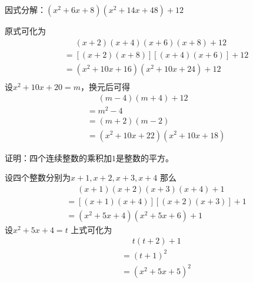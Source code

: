 \documentclass[windows,csize4]{BHCexam}
\begin{document}
\begin{groups}
\begin{questions}[]
        \question[5] 因式分解：$(x^2+6x+8)(x^2+14x+48)+12$
        \begin{solution}{0.5cm}
            \methodonly 原式可化为
            \[
                \begin{aligned}
                     & \phantom{=}(x+2)(x+4)(x+6)(x+8)+12 \\
                     & = [(x+2)(x+8)][(x+4)(x+6)]+12      \\
                     & = (x^2+10x+16)(x^2+10x+24) + 12    \\
                \end{aligned}
            \]
            设$x^2+10x+20=m$，换元后可得
            \[
                \begin{aligned}
                     & \phantom{=}(m-4)(m+4)+12   \\
                     & = m^2-4                    \\
                     & = (m+2)(m-2)               \\
                     & = (x^2+10x+22)(x^2+10x+18)
                \end{aligned}
            \]
        \end{solution}
        \vspace{3.5cm}


        \question[5] 证明：四个连续整数的乘积加$1$是整数的平方。
        \begin{solution}{0.5cm}
            \methodonly 设四个整数分别为$x+1,x+2,x+3,x+4$ 那么
            \[
                \begin{aligned}
                     & \phantom{=}(x+1)(x+2)(x+3)(x+4)+1 \\
                     & = [(x+1)(x+4)][(x+2)(x+3)]+1      \\
                     & = (x^2+5x+4)(x^2+5x+6) +1
                \end{aligned}
            \]
            设$x^2+5x+4=t$ 上式可化为
            \[
                \begin{aligned}
                     & \phantom{=}t(t+2)+1 \\
                     & = (t+1)^2           \\
                     & = (x^2+5x+5)^2
                \end{aligned}
            \]
        \end{solution}
        \vspace{3.5cm}


\end{questions}
\end{groups}
\end{document}
